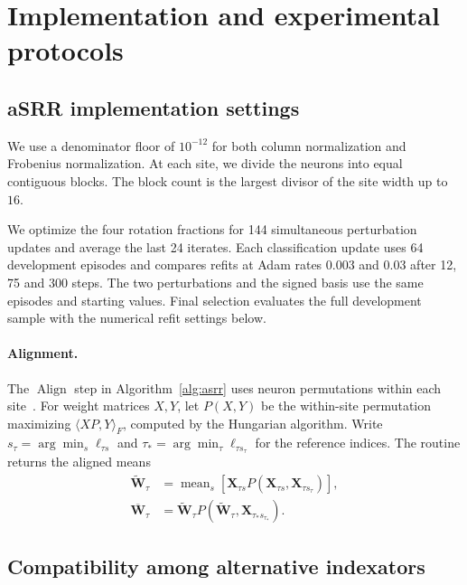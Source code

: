 \section{Implementation and experimental protocols}
\label{app:relu-details}

\subsection{aSRR implementation settings}
\label{app:asrr-construction}

We use a denominator floor of $10^{-12}$ for both column normalization
and Frobenius normalization. At each site, we divide the neurons into
equal contiguous blocks. The block count is the largest divisor of the
site width up to $16$.

We optimize the four rotation fractions for 144 simultaneous
perturbation updates and average the last 24 iterates. Each
classification update uses 64 development episodes and compares
refits at Adam rates 0.003 and 0.03 after 12, 75 and 300 steps.
The two perturbations and the signed basis use the same episodes
and starting values. Final selection evaluates the full development
sample with the numerical refit settings below.

\paragraph*{Alignment.}
The $\operatorname{Align}$ step in Algorithm~\ref{alg:asrr} uses
neuron permutations within each site~\cite[Sec.~2.1]{zhou2023permutation}.
For weight matrices $X,Y$, let $P(X,Y)$ be the within-site permutation
maximizing $\langle XP,Y\rangle_F$, computed by the Hungarian algorithm.
Write $s_\tau=\arg\min_s\ell_{\tau s}$ and
$\tau_*=\arg\min_\tau\ell_{\tau s_\tau}$ for the reference indices. The
routine returns the aligned means
\[
    \begin{aligned}
        \widetilde{\mathbf W}_\tau
            &=\operatorname{mean}_s\!
                \left[\mathbf X_{\tau s}P(\mathbf X_{\tau s},
                    \mathbf X_{\tau s_\tau})\right],\\
        \overline{\mathbf W}_\tau
            &=\widetilde{\mathbf W}_\tau
                P(\widetilde{\mathbf W}_\tau,\mathbf X_{\tau_*s_{\tau_*}}).
    \end{aligned}
\]



\subsection{Compatibility among alternative indexators}
\label{app:relational-compatibility}

